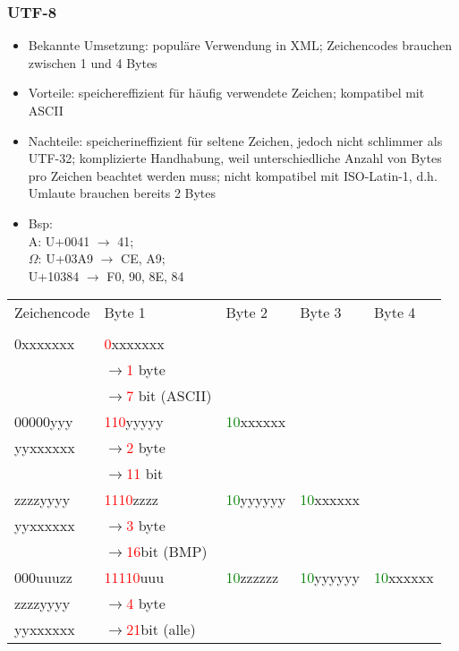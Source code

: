 \documentclass[a4paper,10pt]{article}
\begin{document}
\subsubsection{UTF-8}
\begin{itemize}
\item Bekannte Umsetzung: popul\"are Verwendung in XML; Zeichencodes brauchen zwischen 1 und 4 Bytes
\item Vorteile: speichereffizient f\"ur h\"aufig verwendete Zeichen; kompatibel mit ASCII
\item Nachteile: speicherineffizient f\"ur seltene Zeichen, jedoch nicht schlimmer als UTF-32; komplizierte Handhabung, weil unterschiedliche Anzahl von Bytes pro Zeichen beachtet werden muss; nicht kompatibel mit ISO-Latin-1, d.h. Umlaute brauchen bereits 2 Bytes
\item Bsp: \\ A: U+0041 $\to$ 41; \\ $\Omega$: U+03A9 $\to$ CE, A9; \\ U+10384 $\to$ F0, 90, 8E, 84
\end{itemize}
\begin{tabular}{|l|l|l|l|l|}
\hline
Zeichencode&Byte 1&Byte 2&Byte 3&Byte 4\\&&&&\\\hline
0xxxxxxx&\textcolor{red}{0}xxxxxxx&&&\\
&$\to$\textcolor{red}{1} byte&&&\\
&$\to$\textcolor{red}{7} bit (ASCII)&&&\\\hline
00000yyy&\textcolor{red}{110}yyyyy&\textcolor{green}{10}xxxxxx&&\\
yyxxxxxx&$\to$\textcolor{red}{2} byte&&&\\
&$\to$\textcolor{red}{11} bit&&&\\\hline
zzzzyyyy&\textcolor{red}{1110}zzzz&\textcolor{green}{10}yyyyyy&\textcolor{green}{10}xxxxxx&\\
yyxxxxxx&$\to$\textcolor{red}{3} byte&&&\\
&$\to$\textcolor{red}{16}bit (BMP)&&&\\\hline
000uuuzz&\textcolor{red}{11110}uuu&\textcolor{green}{10}zzzzzz&\textcolor{green}{10}yyyyyy&\textcolor{green}{10}xxxxxx\\
zzzzyyyy&$\to$\textcolor{red}{4} byte&&&\\
yyxxxxxx&$\to$\textcolor{red}{21}bit (alle)&&&\\\hline
\end{tabular}
\end{document}
